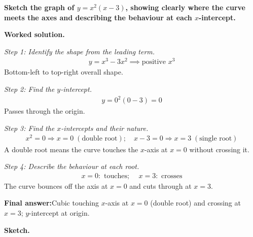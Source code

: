 \documentclass[11pt]{article}
\newcommand{\question}[1]{\par\medskip\noindent\textbf{#1}\par}
\begin{document}
\question{Sketch the graph of \( y = x^2(x - 3) \), showing clearly where the curve meets the axes and describing the behaviour at each \( x \)-intercept.}

\textbf{Worked solution.}

\textit{Step 1: Identify the shape from the leading term.}
\[\begin{gathered}
y = x^3 - 3x^2 \implies \text{positive }x^3
\end{gathered}\]
Bottom-left to top-right overall shape.

\textit{Step 2: Find the \( y \)-intercept.}
\[\begin{gathered}
y = 0^2(0-3) = 0
\end{gathered}\]
Passes through the origin.

\textit{Step 3: Find the \( x \)-intercepts and their nature.}
\[\begin{gathered}
x^2 = 0 \Rightarrow x = 0 \;(\text{double root}); \quad x - 3 = 0 \Rightarrow x = 3 \;(\text{single root})
\end{gathered}\]
A double root means the curve touches the \( x \)-axis at \( x = 0 \) without crossing it.

\textit{Step 4: Describe the behaviour at each root.}
\[\begin{gathered}
x = 0: \text{ touches; } \quad x = 3: \text{ crosses}
\end{gathered}\]
The curve bounces off the axis at \( x = 0 \) and cuts through at \( x = 3 \).

\begin{answerbox}
\textbf{Final answer:}\quad Cubic touching \(\displaystyle x\)-axis at \(\displaystyle x = 0\) (double root) and crossing at \(\displaystyle x = 3\); \(\displaystyle y\)-intercept at origin.
\end{answerbox}
\textbf{Sketch.}
\end{document}

